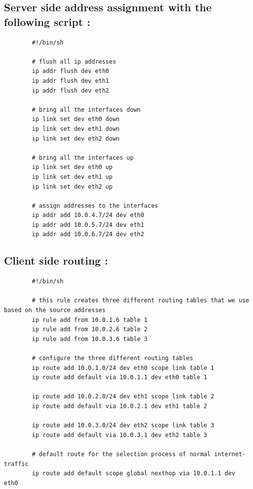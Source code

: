 \documentclass[a4paper,11pt]{article}
\begin{document}
	 	\subsection{Server side address assignment with the following script :}
	 	\label{subsec:serveraddress}
	 	\begin{lstlisting}
	 	#!/bin/sh

	 	# flush all ip addresses
	 	ip addr flush dev eth0
	 	ip addr flush dev eth1
	 	ip addr flush dev eth2

	 	# bring all the interfaces down
	 	ip link set dev eth0 down
	 	ip link set dev eth1 down
	 	ip link set dev eth2 down

	 	# bring all the interfaces up
	 	ip link set dev eth0 up
	 	ip link set dev eth1 up
	 	ip link set dev eth2 up

	 	# assign addresses to the interfaces
	 	ip addr add 10.0.4.7/24 dev eth0
	 	ip addr add 10.0.5.7/24 dev eth1
	 	ip addr add 10.0.6.7/24 dev eth2
	 	\end{lstlisting}

	 	\subsection{Client side routing :}
	 	\label{subsec:clientroute}
	 	\begin{lstlisting}
	 	#!/bin/sh

	 	# this rule creates three different routing tables that we use based on the source addresses
	 	ip rule add from 10.0.1.6 table 1
	 	ip rule add from 10.0.2.6 table 2
	 	ip rule add from 10.0.3.6 table 3

	 	# configure the three different routing tables
	 	ip route add 10.0.1.0/24 dev eth0 scope link table 1
	 	ip route add default via 10.0.1.1 dev eth0 table 1

	 	ip route add 10.0.2.0/24 dev eth1 scope link table 2
	 	ip route add default via 10.0.2.1 dev eth1 table 2

	 	ip route add 10.0.3.0/24 dev eth2 scope link table 3
	 	ip route add default via 10.0.3.1 dev eth2 table 3

	 	# default route for the selection process of normal internet-traffic
	 	ip route add default scope global nexthop via 10.0.1.1 dev eth0
	 	\end{lstlisting}
\end{document}
